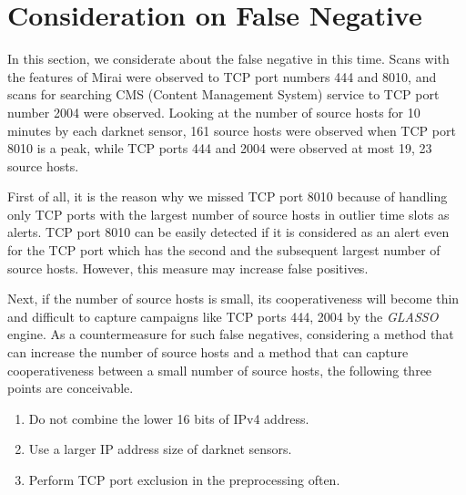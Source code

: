 \documentclass[conference]{IEEEtran}
\begin{document}

\section{Consideration on False Negative}
In this section, we considerate about the false negative in this time.
Scans with the features of Mirai were observed to TCP port numbers 444 and 8010, and scans for searching CMS (Content Management System) service to TCP port number 2004 were observed.
Looking at the number of source hosts for 10 minutes by each darknet sensor, 161 source hosts were observed when TCP port 8010 is a peak, while TCP ports 444 and 2004 were observed at most 19, 23 source hosts.


First of all, it is the reason why we missed TCP port 8010 because of handling only TCP ports with the largest number of source hosts in outlier time slots as alerts.
TCP port 8010 can be easily detected if it is considered as an alert even for the TCP port which has the second and the subsequent largest number of source hosts.
However, this measure may increase false positives.



Next, if the number of source hosts is small, its cooperativeness will become thin and difficult to capture campaigns like TCP ports 444, 2004 by the {\it GLASSO} engine.
As a countermeasure for such false negatives, considering a method that can increase the number of source hosts and a method that can capture cooperativeness between a small number of source hosts, the following three points are conceivable.
\begin{enumerate}
  \item Do not combine the lower 16 bits of IPv4 address.
  \item Use a larger IP address size of darknet sensors.
  \item Perform TCP port exclusion in the preprocessing often.
\end{enumerate}


\end{document}
